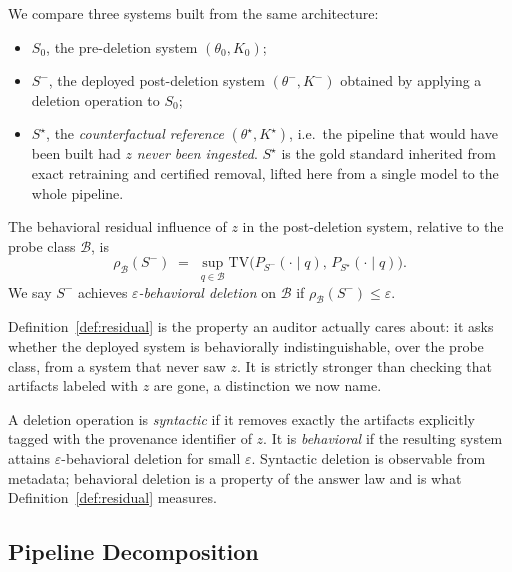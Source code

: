 We compare three systems built from the same architecture:
\begin{itemize}
\item $S_0$, the pre-deletion system $(\theta_0,K_0)$;
\item $S^{-}$, the deployed post-deletion system $(\theta^{-},K^{-})$
obtained by applying a deletion operation to $S_0$;
\item $S^{\star}$, the \emph{counterfactual reference} $(\theta^{\star},
K^{\star})$, i.e.\ the pipeline that would have been built had $z$
\emph{never been ingested}. $S^{\star}$ is the gold standard inherited
from exact retraining and certified removal, lifted here from a single
model to the whole pipeline.
\end{itemize}

\begin{definition}
\label{def:residual}
The behavioral residual influence of $z$ in the post-deletion system,
relative to the probe class $\mathcal{B}$, is
\[
 \rho_{\mathcal{B}}(S^{-})
 \;=\;
 \sup_{q\in\mathcal{B}}
 \mathrm{TV}\!\big(P_{S^{-}}(\cdot\mid q),\,P_{S^{\star}}(\cdot\mid q)\big).
\]
We say $S^{-}$ achieves \emph{$\varepsilon$-behavioral deletion} on
$\mathcal{B}$ if $\rho_{\mathcal{B}}(S^{-})\le\varepsilon$.
\end{definition}

Definition~\ref{def:residual} is the property an auditor actually cares
about: it asks whether the deployed system is behaviorally
indistinguishable, over the probe class, from a system that never saw
$z$. It is strictly stronger than checking that artifacts labeled with
$z$ are gone, a distinction we now name.

\begin{definition}
\label{def:syntactic}
A deletion operation is \emph{syntactic} if it removes exactly the
artifacts explicitly tagged with the provenance identifier of $z$. It is
\emph{behavioral} if the resulting system attains
$\varepsilon$-behavioral deletion for small $\varepsilon$. Syntactic
deletion is observable from metadata; behavioral deletion is a property
of the answer law and is what Definition~\ref{def:residual} measures.
\end{definition}

\subsection{Pipeline Decomposition}

